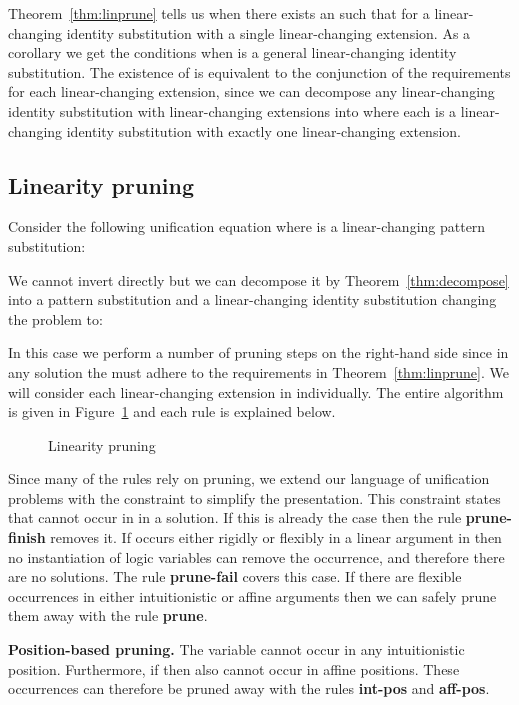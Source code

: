 \documentclass{eptcs}
\theoremstyle{definition}
\begin{document}
Theorem~\ref{thm:linprune} tells us when there exists an  such that
 for a linear-changing identity substitution  with a
single linear-changing extension.  As a corollary we get the conditions
when  is a general linear-changing identity substitution.  The
existence of  is equivalent to the
conjunction of the requirements for each linear-changing extension,
since we can decompose any linear-changing identity substitution 
with  linear-changing extensions into
 where each  is a
linear-changing identity substitution with exactly one linear-changing
extension.

\subsection{Linearity pruning}
Consider the following unification equation where  is a
linear-changing pattern substitution:

We cannot invert  directly but we can decompose it by
Theorem~\ref{thm:decompose} into a pattern
substitution  and a linear-changing identity substitution 
changing the problem to:

In this case we perform a number of pruning steps on the right-hand side
since in any solution the  must adhere to the requirements in
Theorem~\ref{thm:linprune}.  We will consider each linear-changing
extension  in  individually.
The entire algorithm is given in Figure~\ref{fig:lin-prun1}
and each rule is explained below.

\begin{figure}

\caption{Linearity pruning\label{fig:lin-prun1}}
\end{figure} 




Since many of the rules rely on pruning, we extend our language of
unification problems with the constraint  to
simplify the presentation.  This
constraint states that  cannot occur in  in a solution.  If this is
already the case then the rule \textbf{prune-finish} removes it.  If  occurs either rigidly or
flexibly in a linear argument in  then no instantiation of logic
variables can remove the occurrence, and therefore there are no
solutions.  The rule \textbf{prune-fail} covers this case.  If there are
flexible occurrences in either intuitionistic or affine arguments then
we can safely prune them away with the rule \textbf{prune}.

\medskip \noindent\textbf{Position-based pruning.}
The variable  cannot occur in any intuitionistic position.  
Furthermore, if  then  also cannot occur in affine positions.
These occurrences can therefore be pruned away with the rules
\textbf{int-pos} and \textbf{aff-pos}.
\end{document}
